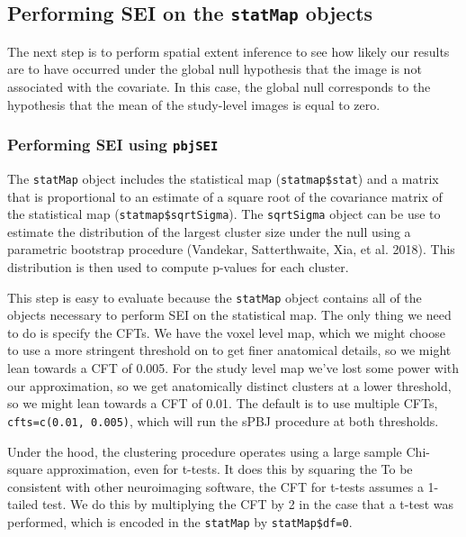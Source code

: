 \documentclass[]{article}
\begin{document}
\hypertarget{performing-sei-on-the-statmap-objects}{%
\subsection{\texorpdfstring{Performing SEI on the \texttt{statMap}
objects}{Performing SEI on the statMap objects}}\label{performing-sei-on-the-statmap-objects}}

The next step is to perform spatial extent inference to see how likely
our results are to have occurred under the global null hypothesis that
the image is not associated with the covariate. In this case, the global
null corresponds to the hypothesis that the mean of the study-level
images is equal to zero.

\hypertarget{performing-sei-using-pbjsei}{%
\subsubsection{\texorpdfstring{Performing SEI using
\texttt{pbjSEI}}{Performing SEI using pbjSEI}}\label{performing-sei-using-pbjsei}}

The \texttt{statMap} object includes the statistical map
(\texttt{statmap\$stat}) and a matrix that is proportional to an
estimate of a square root of the covariance matrix of the statistical
map (\texttt{statmap\$sqrtSigma}). The \texttt{sqrtSigma} object can be
use to estimate the distribution of the largest cluster size under the
null using a parametric bootstrap procedure (Vandekar, Satterthwaite,
Xia, et al. 2018). This distribution is then used to compute p-values
for each cluster.

This step is easy to evaluate because the \texttt{statMap} object
contains all of the objects necessary to perform SEI on the statistical
map. The only thing we need to do is specify the CFTs. We have the voxel
level map, which we might choose to use a more stringent threshold on to
get finer anatomical details, so we might lean towards a CFT of 0.005.
For the study level map we've lost some power with our approximation, so
we get anatomically distinct clusters at a lower threshold, so we might
lean towards a CFT of 0.01. The default is to use multiple CFTs,
\texttt{cfts=c(0.01,\ 0.005)}, which will run the sPBJ procedure at both
thresholds.

Under the hood, the clustering procedure operates using a large sample
Chi-square approximation, even for t-tests. It does this by squaring the
To be consistent with other neuroimaging software, the CFT for t-tests
assumes a 1-tailed test. We do this by multiplying the CFT by 2 in the
case that a t-test was performed, which is encoded in the
\texttt{statMap} by \texttt{statMap\$df=0}.
\end{document}
